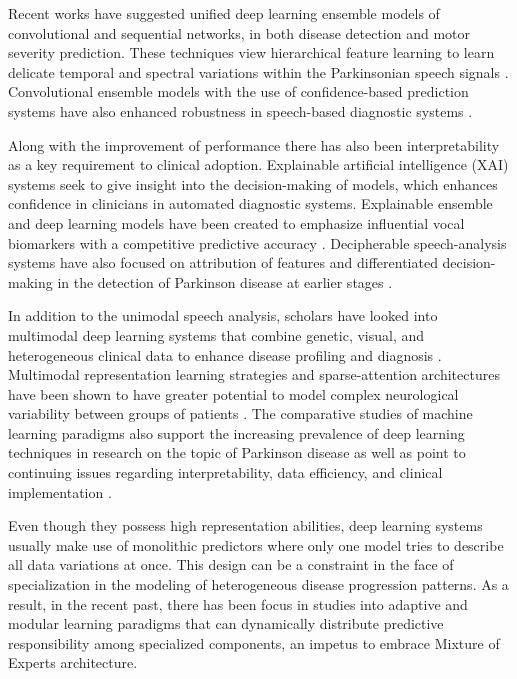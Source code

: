 \documentclass{customIEEEsingle}
\begin{document}
	Recent works have suggested unified deep learning ensemble models of convolutional and sequential networks, in both disease detection and motor severity prediction. These techniques view hierarchical feature learning to learn delicate temporal and spectral variations within the Parkinsonian speech signals \cite{khedimi-2025}. Convolutional ensemble models with the use of confidence-based prediction systems have also enhanced robustness in speech-based diagnostic systems \cite{titouni-2026}.
	
	Along with the improvement of performance there has also been interpretability as a key requirement to clinical adoption. Explainable artificial intelligence (XAI) systems seek to give insight into the decision-making of models, which enhances confidence in clinicians in automated diagnostic systems. Explainable ensemble and deep learning models have been created to emphasize influential vocal biomarkers with a competitive predictive accuracy \cite{aladhadh-2025}. Decipherable speech-analysis systems have also focused on attribution of features and differentiated decision-making in the detection of Parkinson disease at earlier stages \cite{simone-2025,xu-2025}.
	
	In addition to the unimodal speech analysis, scholars have looked into multimodal deep learning systems that combine genetic, visual, and heterogeneous clinical data to enhance disease profiling and diagnosis \cite{cao-2025}. Multimodal representation learning strategies and sparse-attention architectures have been shown to have greater potential to model complex neurological variability between groups of patients \cite{datta-2026}. The comparative studies of machine learning paradigms also support the increasing prevalence of deep learning techniques in research on the topic of Parkinson disease as well as point to continuing issues regarding interpretability, data efficiency, and clinical implementation \cite{chaithanya-2025,kumar-2025}.
		
	Even though they possess high representation abilities, deep learning systems usually make use of monolithic predictors where only one model tries to describe all data variations at once. This design can be a constraint in the face of specialization in the modeling of heterogeneous disease progression patterns. As a result, in the recent past, there has been focus in studies into adaptive and modular learning paradigms that can dynamically distribute predictive responsibility among specialized components, an impetus to embrace Mixture of Experts architecture.
\end{document}
